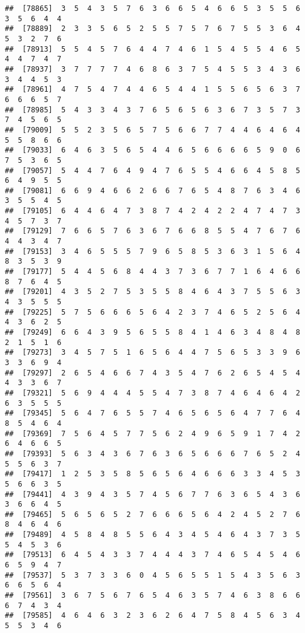 \documentclass[
]{book}
\begin{document}
\begin{verbatim}
##  [78865]  3  5  4  3  5  7  6  3  6  6  5  4  6  6  5  3  5  5  6  3  5  6  4  4
##  [78889]  2  3  3  5  6  5  2  5  5  7  5  7  6  7  5  5  3  6  4  5  3  2  7  6
##  [78913]  5  5  4  5  7  6  4  4  7  4  6  1  5  4  5  5  4  6  5  4  4  7  4  7
##  [78937]  3  7  7  7  7  4  6  8  6  3  7  5  4  5  5  3  4  3  6  3  4  4  5  3
##  [78961]  4  7  5  4  7  4  4  6  5  4  4  1  5  5  6  5  6  3  7  6  6  6  5  7
##  [78985]  5  4  3  3  4  3  7  6  5  6  5  6  3  6  7  3  5  7  3  7  4  5  6  5
##  [79009]  5  5  2  3  5  6  5  7  5  6  6  7  7  4  4  6  4  6  4  5  5  8  6  6
##  [79033]  6  4  6  3  5  6  5  4  4  6  5  6  6  6  6  5  9  0  6  7  5  3  6  5
##  [79057]  5  4  4  7  6  4  9  4  7  6  5  5  4  6  6  4  5  8  5  6  4  9  5  5
##  [79081]  6  6  9  4  6  6  2  6  6  7  6  5  4  8  7  6  3  4  6  3  5  5  4  5
##  [79105]  6  4  4  6  4  7  3  8  7  4  2  4  2  2  4  7  4  7  3  4  5  7  3  7
##  [79129]  7  6  6  5  7  6  3  6  7  6  6  8  5  5  4  7  6  7  6  4  4  3  4  7
##  [79153]  3  4  6  5  5  5  7  9  6  5  8  5  3  6  3  1  5  6  4  8  3  5  3  9
##  [79177]  5  4  4  5  6  8  4  4  3  7  3  6  7  7  1  6  4  6  6  8  7  6  4  5
##  [79201]  4  3  5  2  7  5  3  5  5  8  4  6  4  3  7  5  5  6  3  4  3  5  5  5
##  [79225]  5  7  5  6  6  6  5  6  4  2  3  7  4  6  5  2  5  6  4  4  3  6  2  5
##  [79249]  6  6  4  3  9  5  6  5  5  8  4  1  4  6  3  4  8  4  8  2  1  5  1  6
##  [79273]  3  4  5  7  5  1  6  5  6  4  4  7  5  6  5  3  3  9  6  3  3  6  9  4
##  [79297]  2  6  5  4  6  6  7  4  3  5  4  7  6  2  6  5  4  5  4  4  3  3  6  7
##  [79321]  5  6  9  4  4  4  5  5  4  7  3  8  7  4  6  4  6  4  2  6  3  5  5  5
##  [79345]  5  6  4  7  6  5  5  7  4  6  5  6  5  6  4  7  7  6  4  8  5  4  6  4
##  [79369]  7  5  6  4  5  7  7  5  6  2  4  9  6  5  9  1  7  4  2  6  4  6  6  5
##  [79393]  5  6  3  4  3  6  7  6  3  6  5  6  6  6  7  6  5  2  4  5  5  6  3  7
##  [79417]  1  2  5  3  5  8  5  6  5  6  4  6  6  6  3  3  4  5  3  5  6  6  3  5
##  [79441]  4  3  9  4  3  5  7  4  5  6  7  7  6  3  6  5  4  3  6  3  6  6  4  5
##  [79465]  5  6  5  6  5  2  7  6  6  6  5  6  4  2  4  5  2  7  6  8  4  6  4  6
##  [79489]  4  5  8  4  8  5  5  6  4  3  4  5  4  6  4  3  7  3  5  5  4  5  3  6
##  [79513]  6  4  5  4  3  3  7  4  4  4  3  7  4  6  5  4  5  4  6  6  5  9  4  7
##  [79537]  5  3  7  3  3  6  0  4  5  6  5  5  1  5  4  3  5  6  3  6  6  5  6  4
##  [79561]  3  6  7  5  6  7  6  5  4  6  3  5  7  4  6  3  8  6  6  6  7  4  3  4
##  [79585]  4  6  4  6  3  2  3  6  2  6  4  7  5  8  4  5  6  3  4  5  5  3  4  6

\end{verbatim}
\end{document}
